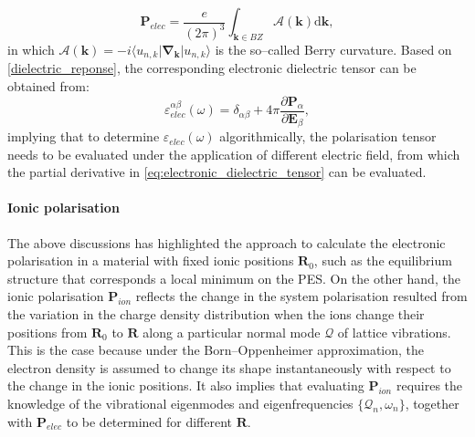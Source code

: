 \begin{equation}\label{electron_pol_DFT}
\bm{P}_{elec}=\frac{e}{(2\pi)^{3}}\int_{\bm{k}\in BZ}\mathcal{A}(\bm{k})\mbox{d}\bm{k},
\end{equation}
in which $\mathcal{A}(\bm{k})=-i\langle u_{n,k}|\bm{\nabla}_{\bm{k}}|u_{n,k}\rangle$ is the so--called Berry curvature.  Based on \cref{dielectric_reponse}, the corresponding electronic dielectric tensor can be obtained from:\cite{souza2002first}
\begin{equation}\label{eq:electronic_dielectric_tensor}
    \varepsilon^{\alpha\beta}_{elec}(\omega)=\delta_{\alpha\beta}+4\pi\frac{\partial \bm{P}_{\alpha}}{\partial \bm{E}_{\beta}},
\end{equation}
implying that to determine $\varepsilon_{elec}(\omega)$ algorithmically, the polarisation tensor needs to be evaluated under the application of different electric field, from which the partial derivative in \cref{eq:electronic_dielectric_tensor} can be evaluated. 

\paragraph{\textbf{Ionic polarisation}} The above discussions has highlighted the approach to calculate the electronic polarisation in a material with fixed ionic positions $\bm{R}_{0}$, such as the equilibrium structure that corresponds a local minimum on the PES. On the other hand, the ionic polarisation $\bm{P}_{ion}$ reflects the change in the system polarisation resulted from the variation in the  charge density distribution when the ions change their positions from $\bm{R}_{0}$ to $\bm{R}$ along a particular normal mode $\bm{\mathcal{Q}}$ of lattice vibrations. This is the case because under the Born--Oppenheimer approximation,  the electron density is assumed to change its shape instantaneously with respect to the change in the ionic positions. It also implies that evaluating $\bm{P}_{ion}$ requires the knowledge of the vibrational eigenmodes and eigenfrequencies $\{\bm{\mathcal{Q}}_n,\omega_n\}$, together with  $\bm{P}_{elec}$ to be determined for different $\bm{R}$. 

